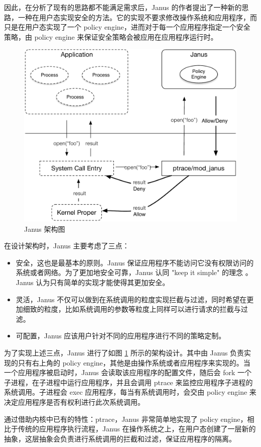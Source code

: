 \documentclass[final,12pt]{elsarticle}
\begin{document}
因此，在分析了现有的思路都不能满足需求后，Janus 的作者提出了一种新的思路，一种在用户态实现安全的方法。它的实现不要求修改操作系统和应用程序，而只是在用户态实现了一个 policy engine，进而对于每一个应用程序指定一个安全策略，由 policy engine 来保证安全策略会被应用在应用程序运行时。

\begin{figure}
\centering
\includegraphics[width=0.7\linewidth]{imgs/janus}
\caption{Janus 架构图}
\label{fig:janus}
\end{figure}

在设计架构时，Janus 主要考虑了三点：

\begin{itemize}
\item
安全，这也是最基本的原则。Janus 保证应用程序不能访问它没有权限访问的系统或者网络。为了更加地安全可靠，Janus 认同 "keep it simple" 的理念 \cite{keepitsimple}。Janus 认为只有简单的实现才能使得其更加安全。
\item
灵活，Janus 不仅可以做到在系统调用的粒度实现拦截与过滤，同时希望在更加细致的粒度，比如系统调用的参数等粒度上同样可以进行请求的拦截与过滤。
\item
可配置，Janus 应该用户针对不同的应用程序进行不同的策略定制。
\end{itemize}

为了实现上述三点，Janus 进行了如图 \ref{fig:janus} 所示的架构设计。其中由 Janus 负责实现的只有右上角的 policy engine，其他是由操作系统或者应用程序来实现的。当一个应用程序被启动时，Janus 会读取该应用程序的配置文件，随后会 fork 一个子进程，在子进程中运行应用程序，并且会调用 ptrace 来监控应用程序子进程的系统调用。子进程会 exec 应用程序，每当有系统调用时，会交由 policy engine 来决定应用程序是否有权利进行此次系统调用。

通过借助内核中已有的特性：ptrace，Janus 非常简单地实现了 policy engine，相比于传统的应用程序执行流程，Janus 在操作系统之上，在用户态创建了一层新的抽象，这层抽象会负责进行系统调用的拦截和过滤，保证应用程序的隔离。
\end{document}
